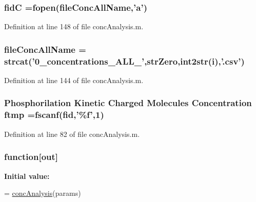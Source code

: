 \hypertarget{a00019_a5650dbe23ad9065391c1ea56f8acd34c}{
\subsubsection[{fid\-C}]{\setlength{\rightskip}{0pt plus 5cm}fid\-C =fopen({\bf file\-Conc\-All\-Name},'{\bf a}')}}\label{a00019_a5650dbe23ad9065391c1ea56f8acd34c}


Definition at line 148 of file conc\-Analysis.\-m.

\hypertarget{a00019_a45b397c4e1bd8e68da97ba6d26fbb41f}{
\subsubsection[{file\-Conc\-All\-Name}]{\setlength{\rightskip}{0pt plus 5cm}file\-Conc\-All\-Name = strcat('0\-\_\-concentrations\-\_\-\-A\-L\-L\-\_\-',str\-Zero,int2str(i),'.\-csv')}}\label{a00019_a45b397c4e1bd8e68da97ba6d26fbb41f}


Definition at line 144 of file conc\-Analysis.\-m.

\hypertarget{a00019_ad82fa813707dc406b75a0b6e38d45a3e}{
\subsubsection[{ftmp}]{\setlength{\rightskip}{0pt plus 5cm}Phosphorilation Kinetic Charged Molecules Concentration ftmp ={\bf fscanf}({\bf fid},'\%{\bf f}',1)}}\label{a00019_ad82fa813707dc406b75a0b6e38d45a3e}


Definition at line 82 of file conc\-Analysis.\-m.

\hypertarget{a00019_a370f3dd25136a73d619eba0aa2e3bb4b}{
\subsubsection[{function}]{\setlength{\rightskip}{0pt plus 5cm}function\mbox{[}{\bf out}\mbox{]}}}\label{a00019_a370f3dd25136a73d619eba0aa2e3bb4b}
{\bfseries Initial value\-:}
\begin{DoxyCode}
= \hyperlink{a00030_a18a344cbdf9b3218a438bca78547ab9e}{concAnalysis}(params)
%
%
\end{DoxyCode}


